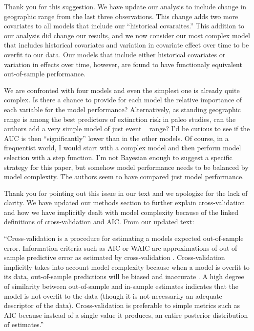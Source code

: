\documentclass[12pt,letterpaper]{article}
\begin{document}
\begin{refsection}
Thank you for this suggestion. We have update our analysis to include change in geographic range from the last three observations. This change adds two more covariates to all models that include our ``historical covaraites.'' This addition to our analysis did change our results, and we now consider our most complex model that includes historical covariates and variation in covariate effect over time to be overfit to our data. Our models that include either historical covariates or variation in effects over time, however, are found to have functionaly equivalent out-of-sample performance.



\begin{bfseries}
  We are confronted with four models and even the simplest one is already quite complex. Is there a chance to provide for each model the relative importance of each variable for the model performance? Alternatively, as standing geographic range is among the best predictors of extinction risk in paleo studies, can the authors add a very simple model of just event ~ range? I’d be curious to see if the AUC is then “significantly” lower than in the other models. Of course, in a frequentist world, I would start with a complex model and then perform model selection with a step function. I’m not Bayesian enough to suggest a specific strategy for this paper, but somehow model performance needs to be balanced by model complexity. The authors seem to have compared just model performance.
\end{bfseries}

Thank you for pointing out this issue in our text and we apologize for the lack of clarity. We have updated our methods section to further explain cross-validation and how we have implicitly dealt with model complexity because of the linked definitions of cross-validation and AIC. From our updated text:

``Cross-validation is a procedure for estimating a models expected out-of-sample error. Information criteria such as AIC or WAIC are approximations of out-of-sample predictive error as estimated by cross-validation \citep{ESL,Gelman2013d}. Cross-validation implicitly takes into account model complexity because when a model is overfit to its data, out-of-sample predictions will be biased and inaccurate \citep{ESL}. A high degree of similarity between out-of-sample and in-sample estimates indicates that the model is not overfit to the data (though it is not necessarily an adequate descriptor of the data). Cross-validation is preferable to simple metrics such as AIC because instead of a single value it produces, an entire posterior distribution of estimates.''


\end{refsection}
\end{document}
